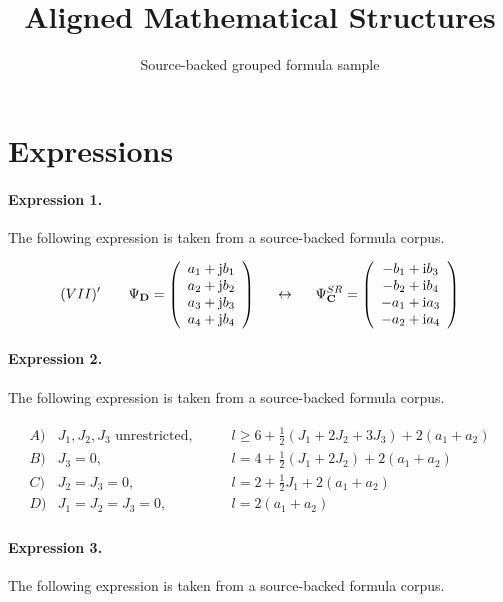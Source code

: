 \documentclass[11pt]{article}
\title{Aligned Mathematical Structures}
\author{Source-backed grouped formula sample}
\date{}
\begin{document}
\maketitle
\section{Expressions}
\paragraph{Expression 1.} The following expression is taken from a source-backed formula corpus.

\begin{align*}(VII)' \hspace{7mm} \Psi_{\bf D} =\left(\begin{array}{c}a_1 +{\rm j}b_1 \\a_2 +{\rm j}b_2 \\a_3 +{\rm j}b_3 \\a_4 +{\rm j}b_4\end{array}\right) \hspace{5mm} \leftrightarrow \hspace{5mm}\Psi^{SR}_{\bf C} =\left(\begin{array}{c}-b_1+{\rm i}b_3 \\-b_2+{\rm i}b_4 \\-a_1+{\rm i}a_3 \\-a_2+{\rm i}a_4\end{array}\right)\end{align*}

\paragraph{Expression 2.} The following expression is taken from a source-backed formula corpus.

\begin{align*} \begin{array}{lll} A) & J_1,J_2,J_3\text{ unrestricted,} \qquad & l \geq 6 + \frac{1}{2}(J_1+2 J_2+3 J_3) + 2(a_1+a_2) \\ B) & J_3 = 0, \qquad & l = 4 + \frac{1}{2} (J_1+2 J_2)+ 2(a_1+a_2) \\ C) & J_2=J_3=0, \qquad & l = 2 + \frac{1}{2} J_1 + 2(a_1+a_2) \\ D) & J_1=J_2=J_3=0,\qquad & l = 2 (a_1+a_2) \end{array}\end{align*}

\paragraph{Expression 3.} The following expression is taken from a source-backed formula corpus.
\end{document}
